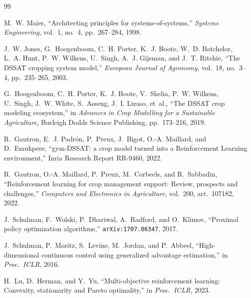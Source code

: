 \begin{thebibliography}{99}

M.~W. Maier,
``Architecting principles for systems-of-systems,''
\emph{Systems Engineering}, vol.~1, no.~4, pp.~267--284, 1998.

J.~W. Jones, G.~Hoogenboom, C.~H. Porter, K.~J. Boote, W.~D. Batchelor, L.~A. Hunt,
P.~W. Wilkens, U.~Singh, A.~J. Gijsman, and J.~T. Ritchie,
``The DSSAT cropping system model,''
\emph{European Journal of Agronomy}, vol.~18, no.~3--4, pp.~235--265, 2003.

G.~Hoogenboom, C.~H. Porter, K.~J. Boote, V.~Shelia, P.~W. Wilkens, U.~Singh,
J.~W. White, S.~Asseng, J.~I. Lizaso, et~al.,
``The DSSAT crop modeling ecosystem,'' in
\emph{Advances in Crop Modelling for a Sustainable Agriculture}, Burleigh Dodds Science
Publishing, pp.~173--216, 2019.

R.~Gautron, E.~J. Padr\'on, P.~Preux, J.~Bigot, O.-A. Maillard, and D.~Emukpere,
``gym-DSSAT: a crop model turned into a Reinforcement Learning environment,''
Inria Research Report RR-9460, 2022.

R.~Gautron, O.-A. Maillard, P.~Preux, M.~Corbeels, and R.~Sabbadin,
``Reinforcement learning for crop management support: Review, prospects and challenges,''
\emph{Computers and Electronics in Agriculture}, vol.~200, art.~107182, 2022.

J.~Schulman, F.~Wolski, P.~Dhariwal, A.~Radford, and O.~Klimov,
``Proximal policy optimization algorithms,''
\texttt{arXiv:1707.06347}, 2017.

J.~Schulman, P.~Moritz, S.~Levine, M.~Jordan, and P.~Abbeel,
``High-dimensional continuous control using generalized advantage estimation,'' in
\emph{Proc.\ ICLR}, 2016.

H.~Lu, D.~Herman, and Y.~Yu,
``Multi-objective reinforcement learning: Convexity, stationarity and Pareto optimality,''
in \emph{Proc.\ ICLR}, 2023.

\end{thebibliography}
